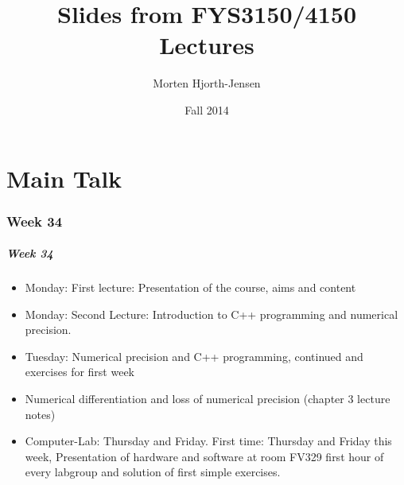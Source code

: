 \documentclass[compress]{beamer}
\title[FYS3150]{Slides from FYS3150/4150 Lectures}
\author[Computational Physics I, FYS3150]{%
  Morten Hjorth-Jensen}
\institute[ORNL, University of Oslo and MSU]{
  Department of Physics and Center of Mathematics for Applications\\
  University of Oslo, N-0316 Oslo, Norway  and \\
National Superconducting Cyclotron Laboratory, Michigan State University, East Lansing, MI 48824, USA}
\date[UiO]{Fall 2014}
\begin{document}
\frame{\titlepage}




\part<presentation>{Main Talk}



\section{Week 34}

\frame
{
  \frametitle{Week 34}
  \begin{block}{}
\begin{itemize}
\item Monday: First lecture: Presentation of the course, aims and content
\item Monday: Second Lecture: Introduction to C++ programming and numerical
precision.
\item Tuesday: Numerical precision and C++ programming, continued and exercises for first week
\item Numerical differentiation and loss of numerical precision (chapter 3 lecture notes)
\item Computer-Lab: Thursday and Friday. First time: Thursday and
  Friday this week, Presentation of hardware and software  at room
  FV329 first hour of every labgroup and solution of first simple exercises.
\end{itemize}
  \end{block}
}


\end{document}
